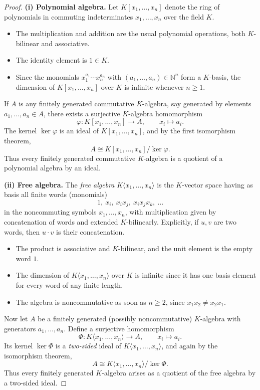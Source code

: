 \begin{proof}
\textbf{(i) Polynomial algebra.}
Let $K[x_1,\dots,x_n]$ denote the ring of polynomials in commuting indeterminates $x_1,\dots,x_n$ over the field $K$.
\begin{itemize}
    \item The multiplication and addition are the usual polynomial operations, both $K$-bilinear and associative.
    \item The identity element is $1\in K$.
    \item Since the monomials $x_1^{a_1}\cdots x_n^{a_n}$ with $(a_1,\dots,a_n)\in\mathbb{N}^n$ form a $K$-basis, the dimension of $K[x_1,\dots,x_n]$ over $K$ is infinite whenever $n\ge1$.
\end{itemize}
If $A$ is any finitely generated commutative $K$-algebra, say generated by elements $a_1,\dots,a_n\in A$, there exists a surjective $K$-algebra homomorphism
\[
\varphi:K[x_1,\dots,x_n]\longrightarrow A,\qquad x_i\longmapsto a_i.
\]
The kernel $\ker\varphi$ is an ideal of $K[x_1,\dots,x_n]$, and by the first isomorphism theorem,
\[
A\cong K[x_1,\dots,x_n]/\ker\varphi.
\]
Thus every finitely generated commutative $K$-algebra is a quotient of a polynomial algebra by an ideal.

\smallskip
\textbf{(ii) Free algebra.}
The \emph{free algebra} $K\langle x_1,\dots,x_n\rangle$ is the $K$-vector space having as basis all finite words (monomials)
\[
1,\ x_i,\ x_ix_j,\ x_ix_jx_k,\ \dots
\]
in the noncommuting symbols $x_1,\dots,x_n$, with multiplication given by concatenation of words and extended $K$-bilinearly.  
Explicitly, if $u,v$ are two words, then $u\cdot v$ is their concatenation.

\begin{itemize}
    \item The product is associative and $K$-bilinear, and the unit element is the empty word $1$.
    \item The dimension of $K\langle x_1,\dots,x_n\rangle$ over $K$ is infinite since it has one basis element for every word of any finite length.
    \item The algebra is noncommutative as soon as $n\ge2$, since $x_1x_2\ne x_2x_1$.
\end{itemize}

Now let $A$ be a finitely generated (possibly noncommutative) $K$-algebra with generators $a_1,\dots,a_n$.  
Define a surjective homomorphism
\[
\Phi:K\langle x_1,\dots,x_n\rangle\longrightarrow A,\qquad x_i\longmapsto a_i.
\]
Its kernel $\ker\Phi$ is a \emph{two-sided} ideal of $K\langle x_1,\dots,x_n\rangle$, and again by the isomorphism theorem,
\[
A\cong K\langle x_1,\dots,x_n\rangle/\ker\Phi.
\]
Thus every finitely generated $K$-algebra arises as a quotient of the free algebra by a two-sided ideal.
\end{proof}

